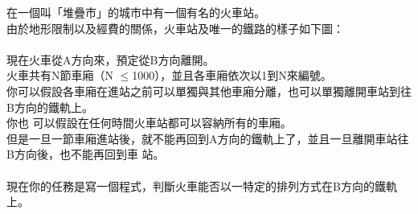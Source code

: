 在一個叫「堆疊市」的城市中有一個有名的火車站。\\
由於地形限制以及經費的關係，火車站及唯一的鐵路的樣子如下圖：\\
\\
現在火車從A方向來，預定從B方向離開。\\
火車共有N節車廂（N $\leq$1000），並且各車廂依次以1到N來編號。\\
你可以假設各車廂在進站之前可以單獨與其他車廂分離，也可以單獨離開車站到往B方向的鐵軌上。\\
你也 可以假設在任何時間火車站都可以容納所有的車廂。\\
但是一旦一節車廂進站後，就不能再回到A方向的鐵軌上了，並且一旦離開車站往B方向後，也不能再回到車 站。\\
\\
現在你的任務是寫一個程式，判斷火車能否以一特定的排列方式在B方向的鐵軌上。\\
